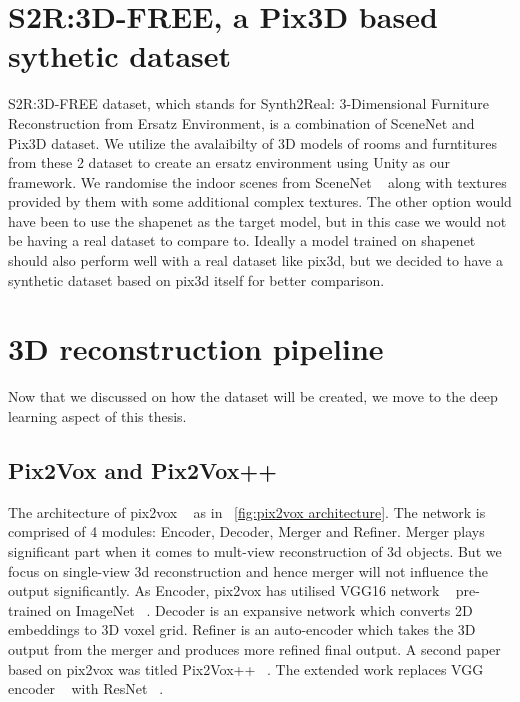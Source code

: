 \section{S2R:3D-FREE, a Pix3D based sythetic dataset}

S2R:3D-FREE dataset, which stands for Synth2Real: 3-Dimensional Furniture Reconstruction from Ersatz Environment, is a combination of SceneNet and Pix3D dataset.
We utilize the avalaibilty of 3D models of rooms and furntitures from these 2 dataset to create an ersatz environment using Unity as our framework.
We randomise the indoor scenes from SceneNet ~\cite{McCormac:etal:ICCV2017} along with textures provided by them with some additional complex textures.
The other option would have been to use the shapenet as the target model, but in this case we would not be having a real dataset to compare to.
Ideally a model trained on shapenet should also perform well with a real dataset like pix3d, but we decided to have a synthetic dataset based on pix3d itself for better comparison.


\section{3D reconstruction pipeline}
Now that we discussed on how the dataset will be created, we move to the deep learning aspect of this thesis.
\subsection{Pix2Vox and Pix2Vox++}
The architecture of pix2vox ~\cite{Xie_2019} as in ~\ref{fig:pix2vox architecture}.
The network is comprised of 4 modules: Encoder, Decoder, Merger and Refiner.
Merger plays significant part when it comes to mult-view reconstruction of 3d objects.
But we focus on single-view 3d reconstruction and hence merger will not influence the output significantly.
As Encoder, pix2vox has utilised VGG16 network ~\cite{simonyan2015deep} pre-trained on ImageNet ~\cite{Deng2009ImageNetAL}.
Decoder is an expansive network which converts 2D embeddings to 3D voxel grid.
Refiner is an auto-encoder which takes the 3D output from the merger and produces more refined final output.
A second paper based on pix2vox was titled Pix2Vox++ ~\cite{Xie_2020}.
The extended work replaces VGG encoder ~\cite{simonyan2015deep} with ResNet ~\cite{He2016DeepRL}.

